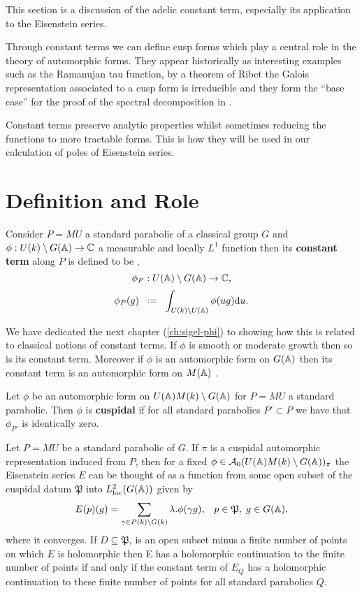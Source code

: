 This section is a discussion of the adelic constant term, especially its application to the Eisenstein series. 

Through constant terms we can define cusp forms which play a central role in the theory of automorphic forms. They appear historically as interesting examples such as the Ramanujan tau function, by a theorem of Ribet \cite[T2.3]{serreProceedingsInternationalConference1977} the Galois representation associated to a cusp form is irreducible and they form the ``base case'' for the proof of the spectral decomposition in \cite{moeglinSpectralDecompositionEisenstein1995}.

Constant terms preserve analytic properties whilst sometimes reducing the functions to more tractable forms. This is how they will be used in our calculation of poles of Eisenstein series.\label{constant_terms}


\section{Definition and Role} \label{cuspidal_form_definition}\label{sec:L-functions}
Consider \(P=MU\) a standard parabolic of a classical group \(G\) and \(\phi: U(k)\setminus G(\A) \to \C\) a measurable and locally \(L^1\) function then its \textbf{constant term} along \(P\) is defined to be \cite[I.2.6]{moeglinSpectralDecompositionEisenstein1995},
\[\phi_P :  U(\A)\setminus G(\A) \to \C,\]
\[\phi_P(g) \defeq \int_{U(k)\setminus U(\A)}\phi(ug) \mathrm{d}u.\]

We have dedicated the next chapter (\ref{ch:sigel-phi}) to showing how this is related to classical notions of constant terms. If \(\phi\) is smooth or moderate growth then so is its constant term. Moreover if \(\phi\) is an automorphic form on \(G(\A)\) then its constant term is an automorphic form on \(M(\A)\) \cite[6.5]{getzIntroductionAutomorphicRepresentations2024}.

Let \(\phi\) be an automorphic form on \(U(\A)M(k)\setminus G(\A)\) for \(P = MU\) a standard parabolic. Then \(\phi\) is \textbf{cuspidal} if for all standard parabolics \(P'\subset P\) we have that \(\phi_{P'}\) is identically zero. 

\begin{Theorem}
		Let \(P = MU\) be a standard parabolic of \(G\). If \(\pi\) is a cuspidal automorphic representation induced from \(P\), then for a fixed \(\phi \in\mathcal{A}_0(U(\A)M(k)\setminus G(\A))_\pi \) the Eisenstein series \(E\) can be thought of as a function from some open subset of the cuspidal datum \(\mathfrak{P}\) into \(L^2_{\mathrm{loc}}(G(\A))\) given by 
		\[E(p)(g) = \sum_{\gamma \in P(k)\backslash G(k)} \lambda.\phi(\gamma g), \;\;\; p\in \mathfrak{P},\; g\in G(\A),\]
		where it converges. 
		If \(D\subseteq \mathfrak{P}\), is an open subset minus a finite number of points on which \(E\) is holomorphic then E has a holomorphic continuation to the finite number of points if and only if the constant term of \(E_Q\) has a holomorphic continuation to these finite number of points for all standard parabolics \(Q\).
    \end{Theorem}
    
